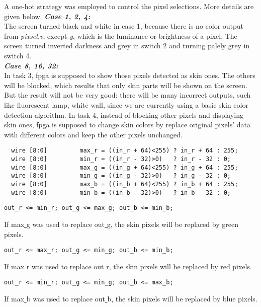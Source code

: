 \documentclass[12pt,fleqn]{article}
\begin{document}
A one-hot strategy was employed to control the pixel selections. More details are given below.
\textbf{\emph{Case 1, 2, 4:}}\\
The screen turned black and white in case 1, because there is no color output from \emph{pixsel.v}, except \emph{y}, which is the luminance or brightness of a pixel; The screen turned inverted darkness and grey in switch 2 and turning palely grey in switch 4.\\
\textbf{\emph{Case 8, 16, 32:}}\\
In task 3, fpga is supposed to show those pixels detected as skin ones. The others will be blocked, which results that only skin parts will be shown on the screen.\\
But the result will not be very good: there will be many incorrect outputs, such like fluorescent lamp, white wall, since we are currently using a basic skin color detection algorithm.
In task 4, instead of blocking other pixels and displaying skin ones, fpga is supposed to change skin colors by replace original pixels' data with different colors and keep the other pixels unchanged.
{\linespread{0.75}
\begin{lstlisting}
  wire [8:0]         max_r = ((in_r + 64)<255) ? in_r + 64 : 255;
  wire [8:0]         min_r = ((in_r - 32)>0)   ? in_r - 32 : 0;
  wire [8:0]         max_g = ((in_g + 64)<255) ? in_g + 64 : 255;
  wire [8:0]         min_g = ((in_g - 32)>0)   ? in_g - 32 : 0;
  wire [8:0]         max_b = ((in_b + 64)<255) ? in_b + 64 : 255;
  wire [8:0]         min_b = ((in_b - 32)>0)   ? in_b - 32 : 0;
\end{lstlisting}
\par}
{\linespread{0.75}
\begin{lstlisting}
out_r <= min_r; out_g <= max_g; out_b <= min_b;
\end{lstlisting}
\par}
If max\underline{ }g was used to replace out\underline{ }g, the skin pixels will be replaced by green pixels.
{\linespread{0.75}
\begin{lstlisting}
out_r <= max_r; out_g <= min_g; out_b <= min_b;
\end{lstlisting}
\par}
If max\underline{ }r was used to replace out\underline{ }r, the skin pixels will be replaced by red pixels.
{\linespread{0.75}
\begin{lstlisting}
out_r <= min_r; out_g <= min_g; out_b <= max_b;
\end{lstlisting}
\par}
If max\underline{ }b was used to replace out\underline{ }b, the skin pixels will be replaced by blue pixels.
\end{document}
